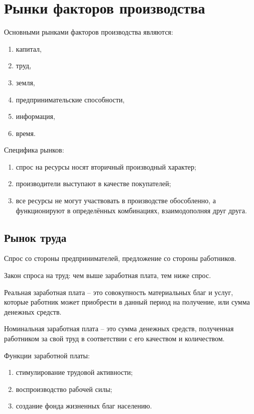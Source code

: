 \section{Рынки факторов производства}

Основными рынками факторов производства являются:
\begin{enumerate}
    \item капитал,
    \item труд,
    \item земля,
    \item предпринимательские способности,
    \item информация,
    \item время.
\end{enumerate}

Специфика рынков:
\begin{enumerate}
    \item спрос на ресурсы носят вторичный производный характер;
    \item производители выступают в качестве покупателей;
    \item все ресурсы не могут участвовать в производстве обособленно,
        а функционируют в определённых комбинациях, взаимодополняя друг друга.
\end{enumerate}

\subsection{Рынок труда}

Спрос со стороны предпринимателей, предложение со стороны работников.

Закон спроса на труд: чем выше заработная плата, тем ниже спрос.

Реальная заработная плата -- это совокупность материальных благ и услуг,
которые работник может приобрести в данный период на получение, или сумма
денежных средств.

Номинальная заработная плата -- это сумма денежных средств, полученная
работником за свой труд в соответствии с его качеством и количеством.
    
Функции заработной платы:
\begin{enumerate}
    \item стимулирование трудовой активности;
    \item воспроизводство рабочей силы;
    \item создание фонда жизненных благ населению.
\end{enumerate}

